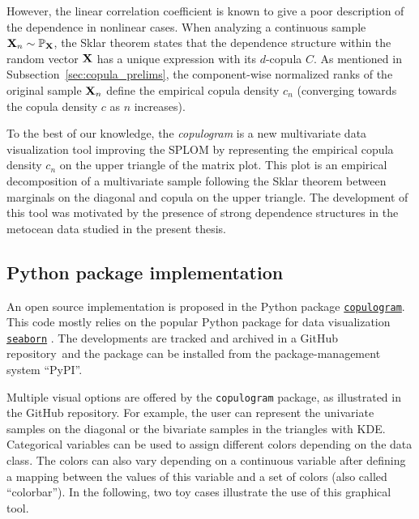 However, the linear correlation coefficient is known to give a poor description of the dependence in nonlinear cases. 
When analyzing a continuous sample ${\bf X}_n \sim \mathbb{P}_{{\bf X}}$, the Sklar theorem states that the dependence structure within the random vector ${\bf X}$ has a unique expression with its $d$-copula $C$. 
As mentioned in Subsection~\ref{sec:copula_prelims}, the component-wise normalized ranks of the original sample ${\bf X}_n$ define the empirical copula density $c_n$ (converging towards the copula density $c$ as $n$ increases).

To the best of our knowledge, the \textit{copulogram} is a new multivariate data visualization tool improving the SPLOM by representing the empirical copula density $c_n$ on the upper triangle of the matrix plot. 
This plot is an empirical decomposition of a multivariate sample following the Sklar theorem between marginals on the diagonal and copula on the upper triangle.
The development of this tool was motivated by the presence of strong dependence structures in the metocean data studied in the present thesis.


\subsection{Python package implementation}

An open source implementation is proposed in the Python package \href{https://github.com/efekhari27/copulogram}{\texttt{copulogram}}. 
This code mostly relies on the popular Python package for data visualization \href{https://seaborn.pydata.org/}{\texttt{seaborn}} \citep{waskom_2021_seaborn}. 
The developments are tracked and archived in a GitHub repository\footnotemark~and the package can be installed from the package-management system ``PyPI''. 

Multiple visual options are offered by the \texttt{copulogram} package, as illustrated in the GitHub repository. 
For example, the user can represent the univariate samples on the diagonal or the bivariate samples in the triangles with KDE.  
Categorical variables can be used to assign different colors depending on the data class. 
The colors can also vary depending on a continuous variable after defining a mapping between the values of this variable and a set of colors (also called ``colorbar'').
In the following, two toy cases illustrate the use of this graphical tool.


